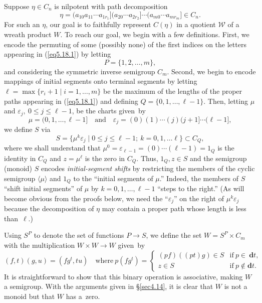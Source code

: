 \documentclass{surv-l}
\numberwithin{equation}{section}
\numberwithin{table}{section}
\numberwithin{figure}{section}
\theoremstyle{plain}
\theoremstyle{definition}
\begin{document}
Suppose $\eta\in C_{n}$ is nilpotent with path decomposition
\begin{equation}\label{eq5.18.1}
\eta=(a_{10}a_{11}\cdots a_{1r_{1}}](a_{20}\cdots a_{2r_{2}}]\cdots(a_{m0}\cdots a_{mr_{m}}]\in C_{n}.
\end{equation}
For such an $\eta$, our goal is to faithfully represent $C(\eta)$
in a quotient $\mathcal{W}$ of a wreath product $W$. To reach our
goal, we begin with a few definitions. First, we encode the
permuting of some (possibly none) of the first indices on the
letters appearing in (\ref{eq5.18.1}) by letting
\[
P=\{1,2,\ldots, m\},
\]
and considering the symmetric inverse semigroup $C_{m}$. Second,
we begin to encode mappings of initial segments onto terminal
segments by letting $\ell= \max\{r_{i}+1\mid i=1,\ldots, m\}$
be the maximum of the lengths of the proper paths appearing in
(\ref{eq5.18.1}) and defining $Q=\{0,1,\ldots, \ell-1\}$. Then,
letting $\mu$ and $\varepsilon_{j},\ 0\leq j\leq \ell-1$, be the
charts given~by
\[
\mu=(0,1,\ldots, \ell-1]\quad \mathrm{and}\quad
\varepsilon_{j}=(0)(1)\cdots(j)(j+1]\cdots (\ell-1],
\]
we define $S$ via
\[
S=\{\mu^{k}\varepsilon_{j}\mid 0\leq j\leq \ell-1;\ k=0,1,\ldots \ell\}\subset C_{Q},
\]
where we shall understand that
$\mu^{0}=\varepsilon_{\ell-1}=(0)\cdots(\ell-1)=1_{Q}$ is the
identity in $C_{Q}$ and $z=\mu^{\ell}$ is the zero in $C_{Q}$.
Thus, $1_{Q},z\in S$ and the semigroup (monoid) $S$ encodes
\emph{initial-segment shifts} by restricting the members of the
cyclic semigroup $\langle\mu\rangle$ and $1_{Q}$ to the ``initial
segments of $\mu$.'' Indeed, the members of $S$ ``shift initial
segments'' of $\mu$ by $k=0,1,\ldots,\ell-1$ ``steps to the
right.'' (As will become obvious from the proofs below, we need
the ``$\varepsilon_{j}$'' on the right of $\mu^{k}\varepsilon_{j}$
because the decomposition of $\eta$ may contain a proper path
whose length is less than~$\ell$.)

Using $S^{P}$ to denote the set of functions $P\rightarrow S$, we
define the set $W= S^{P}\times C_{m}$ with the multiplication
$W\times W\rightarrow W$ given~by
\[
(f,t)(g,u)=(fg^{t}, tu)\quad \mathrm{where}\
p(fg^{t})=\begin{cases}
(pf)((pt)g)\in S &\mathrm{if}\ p\in\ \mathbf{d}t,\\
z\in S & \mathrm{if}\ p\not\in \mathbf{d}t.
\end{cases}
\]
It is straightforward to show that this binary operation is
associative, making $W$ a semigroup. With the arguments given in
\S\ref{sec4.14}, it is clear that $W$ is not a monoid but that $W$
has a~zero.
\end{document}

